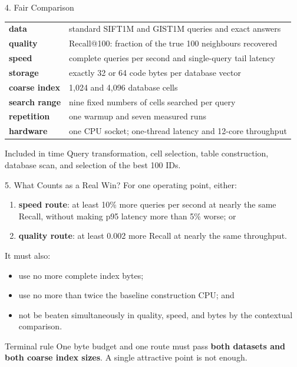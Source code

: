 \documentclass[aspectratio=169]{beamer}
\begin{document}
\begin{frame}{4. Fair Comparison}
\small
\begin{tabularx}{\textwidth}{>{\bfseries}p{} X}
data & standard SIFT1M and GIST1M queries and exact answers\\
quality & Recall@100: fraction of the true 100 neighbours recovered\\
speed & complete queries per second and single-query tail latency\\
storage & exactly 32 or 64 code bytes per database vector\\
coarse index & 1,024 and 4,096 database cells\\
search range & nine fixed numbers of cells searched per query\\
repetition & one warmup and seven measured runs\\
hardware & one CPU socket; one-thread latency and 12-core throughput\\
\end{tabularx}
\normalsize
\begin{block}{Included in time}
Query transformation, cell selection, table construction, database scan, and
selection of the best 100 IDs.
\end{block}
\end{frame}

\begin{frame}{5. What Counts as a Real Win?}
For one operating point, either:
\begin{enumerate}
  \item \textbf{speed route}: at least 10\% more queries per second at nearly
  the same Recall, without making p95 latency more than 5\% worse; or
  \item \textbf{quality route}: at least 0.002 more Recall at nearly the same
  throughput.
\end{enumerate}
\medskip
It must also:
\begin{itemize}
  \item use no more complete index bytes;
  \item use no more than twice the baseline construction CPU; and
  \item not be beaten simultaneously in quality, speed, and bytes by the
  contextual comparison.
\end{itemize}
\begin{alertblock}{Terminal rule}
One byte budget and one route must pass \textbf{both datasets and both coarse
index sizes}. A single attractive point is not enough.
\end{alertblock}
\end{frame}
\end{document}
